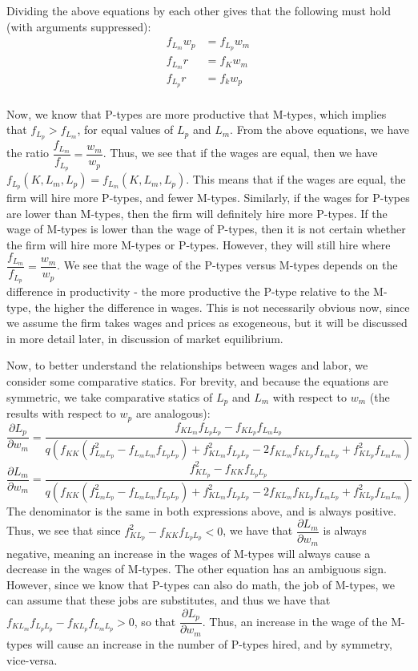 \documentclass[12pt]{article}
\newcommand{\qpartial}[2]{\dfrac{\partial #1}{\partial #2}}
\begin{document}
\begin{enumerate}
Dividing the above equations by each other gives that the following must hold (with arguments suppressed):
\begin{align*}
f_{L_m} w_p &= f_{L_p} w_m \\
f_{L_m} r &= f_K w_m \\
f_{L_p} r &= f_k w_p \\
\end{align*}

Now, we know that P-types are more productive that M-types, which implies that $f_{L_p} > f_{L_m}$, for equal values of $L_p$ and $L_m$.  From the above equations, we have the ratio $\dfrac{f_{L_m}}{f_{L_p}} = \dfrac{w_m}{w_p}$.  Thus, we see that if the wages are equal, then we have $f_{L_p}(K,L_m,L_p) = f_{L_m}(K,L_m,L_p)$.  This means that if the wages are equal, the firm will hire more P-types, and fewer M-types.  Similarly, if the wages for P-types are lower than M-types, then the firm will definitely hire more P-types.  If the wage of M-types is lower than the wage of P-types, then it is not certain whether the firm will hire more M-types or P-types.  However, they will still hire where $\dfrac{f_{L_m}}{f_{L_p}} = \dfrac{w_m}{w_p}$.  We see that the wage of the P-types versus M-types depends on the difference in productivity - the more productive the P-type relative to the M-type, the higher the difference in wages.  This is not necessarily obvious now, since we assume the firm takes wages and prices as exogeneous, but it will be discussed in more detail later, in discussion of market equilibrium.  

Now, to better understand the relationships between wages and labor, we consider some comparative statics.  For brevity, and because the equations are symmetric, we take comparative statics of $L_p$ and $L_m$ with respect to $w_m$ (the results with respect to $w_p$ are analogous):
$$
  \qpartial{L_p}{w_m} = \frac{f_{K L_m} f_{L_p L_p} - f_{K L_p} f_{L_m L_p}}{q \left(f_{K K}
   \left(f_{L_m L_p}^2-f_{L_m L_m} f_{L_p L_p} \right) + f_{K L_m} ^2 f_{L_p L_p}-2
   f_{K L_m} f_{K L_p} f_{L_m L_p} + f_{K L_p}^2 f_{L_m L_m}\right)}
$$
$$
	\qpartial{L_m}{w_m} = \frac{f_{K L_p}^2-f_{KK} f_{L_p L_p}}{q \left(f_{KK}
   \left(f_{L_m L_p}^2-f_{L_m L_m} f_{L_p L_p}\right)+f_{K L_m}^2 f_{L_p L_p}-2
   f_{K L_m} f_{K L_p} f_{L_m L_p}+f_{K L_p}^2 f_{L_m L_m}\right)}
$$
The denominator is the same in both expressions above, and is always positive.  Thus, we see that since $f_{K L_p}^2-f_{KK} f_{L_p L_p} < 0$, we have that $\qpartial{L_m}{w_m}$ is always negative, meaning an increase in the wages of M-types will always cause a decrease in the wages of M-types.  The other equation has an ambiguous sign.  However, since we know that P-types can also do math, the job of M-types, we can assume that these jobs are substitutes, and thus we have that $f_{K L_m} f_{L_p L_p} - f_{K L_p} f_{L_m L_p} > 0$, so that $\qpartial{L_p}{w_m}$.  Thus, an increase in the wage of the M-types will cause an increase in the number of P-types hired, and by symmetry, vice-versa. 


\end{enumerate}
\end{document}
